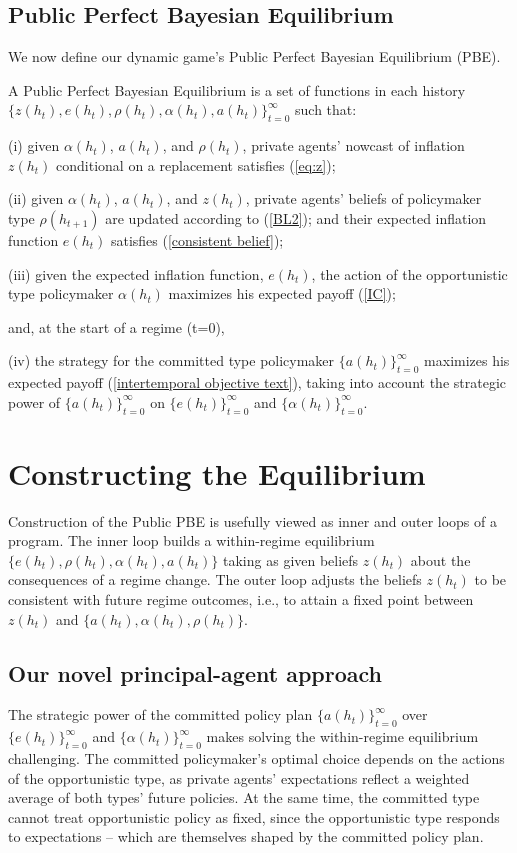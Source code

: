 \documentclass[12pt,letter,leqno]{article}
\theoremstyle{asn}
\theoremstyle{lem}
\theoremstyle{slem}
\theoremstyle{prop}
\theoremstyle{appprop}
\theoremstyle{rem}
\theoremstyle{defn}
\newcommand{\ylcom}[1]{{\color{black} #1}}
\begin{document}
\subsection{Public Perfect Bayesian Equilibrium}

We now define our dynamic game's Public Perfect Bayesian Equilibrium (PBE).

\begin{defn}
A Public Perfect Bayesian Equilibrium is a set of functions in each history $\{z(h_t), e(h_t), \rho(h_t), \alpha(h_t), a(h_t)\}^\infty_{t=0}$ such that:

(i) given $\alpha(h_t)$, $a(h_t)$, and $\rho(h_t)$, private agents' nowcast of inflation $z(h_t)$ conditional on a replacement satisfies (\ref{eq:z});

(ii) given $\alpha(h_t)$, $a(h_t)$, and $z(h_t)$, 
private agents' beliefs of policymaker type $\rho(h_{t+1})$ are updated according to (\ref{BL2}); and their expected inflation function $e(h_t)$ satisfies (\ref{consistent belief}); 

(iii) given the expected inflation function, $e(h_t)$, the action of the opportunistic type policymaker $\alpha(h_t)$ maximizes his expected payoff (\ref{IC}); 

and, at the start of a regime (t=0), 

(iv) the strategy for the committed type policymaker  $\{a(h_t)\}^\infty_{t=0}$ maximizes his 
expected payoff (\ref{intertemporal objective text}), taking into account the strategic power of $\{a(h_t)\}^\infty_{t=0}$ on $\{e(h_t)\}^\infty_{t=0}$ and $\{\alpha(h_t)\}^\infty_{t=0}$.

\end{defn}



\section{Constructing the Equilibrium}

Construction of the Public PBE is usefully viewed as inner and outer loops of a program. The inner loop builds a within-regime equilibrium $
\{e(h_t), \rho(h_t), \alpha(h_t), a(h_t)\}$ taking as given beliefs $z(h_t)$ about the consequences of a regime change. \ylcom{The outer loop adjusts the beliefs $z(h_t)$ to be consistent with future regime  outcomes, i.e., to attain a fixed point between $z(h_t)$ and $\{a(h_t), \alpha(h_t),
\rho(h_t)\}$.}

\subsection{Our novel principal-agent approach}
The strategic power of the committed policy plan $\{a(h_t)\}^\infty_{t=0}$ over $\{e(h_t)\}^\infty_{t=0}$ and $\{\alpha(h_t)\}^\infty_{t=0}$ makes solving the within-regime equilibrium challenging. The committed policymaker’s optimal choice depends on the actions of the opportunistic type, as private agents’ expectations reflect a weighted average of both types’ future policies. At the same time, the committed type cannot treat opportunistic policy as fixed, since the opportunistic type responds to expectations -- which are themselves shaped by the committed policy plan.
\end{document}
